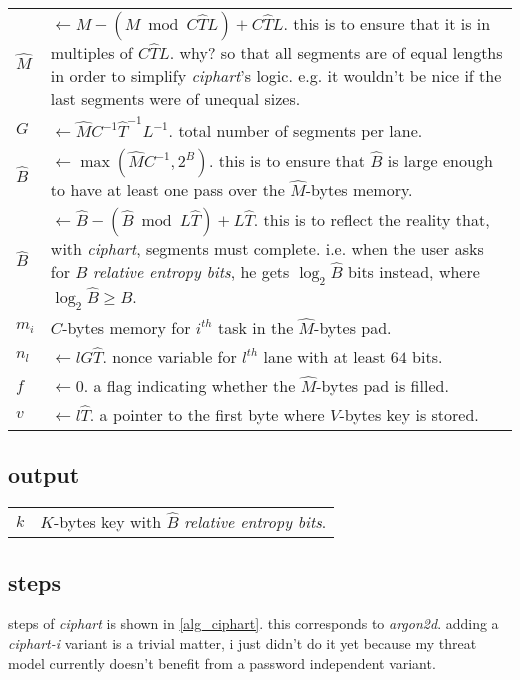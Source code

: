 \documentclass[twocolumn]{article}
\DeclareMathOperator{\maxf}{max}
\begin{document}
\begin{tabularx}{\columnwidth}{lX}
    $\hat M$    & $\gets M - (M \bmod C\hat TL) + C\hat TL$.  this is to
                    ensure that it is in multiples of $C\hat TL$.  why?  so
                    that all segments are of equal lengths in order to
                    simplify \emph{ciphart}'s logic.  e.g. it wouldn't be
                    nice if the last segments were of unequal sizes.\\
    $G$         & $\gets \hat MC^{-1}\hat T^{-1}L^{-1}$.  total number of
                    segments per lane.\\
    $\hat B$    & $\gets \maxf(\hat MC^{-1}, 2^B)$.  this is to ensure
                    that $\hat B$ is large enough to have at least one pass
                    over the $\hat M$-bytes memory.\\
    $\hat B$    & $\gets \hat B - (\hat B \bmod L\hat T) +
                    L\hat T$.  this is to reflect the reality that, with
                    \emph{ciphart}, segments must complete.  i.e. when the
                    user asks for $B$ \emph{relative entropy bits}, he gets
                    $\log_2 \hat B$ bits instead, where $\log_2\hat B \ge
                    B$.\\
    $m_i$       & $C$-bytes memory for $i^{th}$ task in the $\hat M$-bytes
                    pad.\\
    $n_l$       & $\gets lG\hat T$.  nonce variable for $l^{th}$ lane with
                    at least $64$ bits.\\
    $f$         & $\gets 0$.  a flag indicating whether the $\hat M$-bytes
                    pad is filled.\\
    $v$         & $\gets l\hat T$.  a pointer to the first byte where
                    $V$-bytes key is stored.\\
\end{tabularx}

\subsection{output}
\begin{tabular}{ll}
$k$ & $K$-bytes key with $\hat B$ \emph{relative entropy bits}.\\
\end{tabular}

\subsection{steps}
steps of \emph{ciphart} is shown in \cref{alg_ciphart}.  this corresponds
to \emph{argon2d}.  adding a \emph{ciphart-i} variant is a trivial matter,
i just didn't do it yet because my threat model currently doesn't benefit
from a password independent variant.
\end{document}
